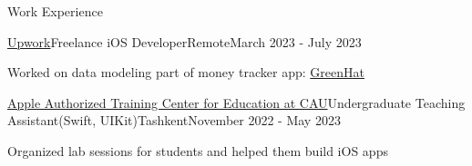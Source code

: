 \begin{resume_section}{Work Experience}
\begin{resume_employer}{\href{https://www.upwork.com/freelancers/~018ad8f0c1b6c76e9c}{Upwork}}{Freelance iOS Developer}{Remote}{March 2023 - July 2023}
  \item Worked on data modeling part of money tracker app: {\href{https://apps.apple.com/uz/app/greenhat-hack-your-finances/id1631715042}{GreenHat}}  
 \end{resume_employer}

\begin{resume_employer}{\href{https://centralasian.uz/appleauthorisedtrainingcentre}{Apple Authorized Training Center for Education at CAU}}{Undergraduate Teaching Assistant(Swift, UIKit)}{Tashkent}{November 2022 - May 2023}







\item Organized lab sessions for students and helped them build iOS apps
 \end{resume_employer}
 
 
\end{resume_section}
